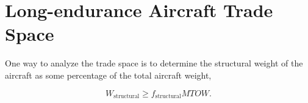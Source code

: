 \documentclass[]{aiaa-tc}%
\begin{document}
%  
% 
% 

\section{Long-endurance Aircraft Trade Space}

One way to analyze the trade space is to determine the structural weight of the aircraft as some percentage of the total aircraft weight, 

\begin{equation}
    \label{e:structualfraction}
    W_{\text{structural}} \geq f_{\text{structural}}MTOW.
\end{equation}
\end{document}
